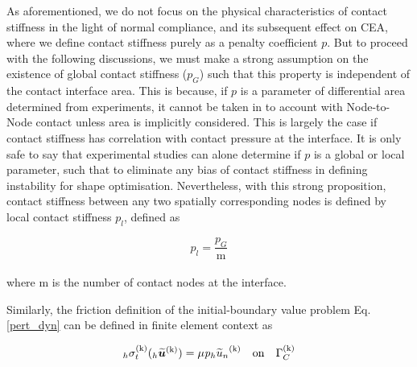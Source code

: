 As aforementioned, we do not focus on the physical characteristics of contact stiffness in the light of normal compliance, and its subsequent effect on CEA, where we define contact stiffness purely as a penalty coefficient $p$. 
But to proceed with the following discussions, we must make a strong assumption on the existence of global contact stiffness ($p_{G}$) such that this property is independent of the contact interface area. 
This is because, if $p$ is a parameter of differential area determined from experiments, it cannot be taken in to account with Node-to-Node contact unless area is implicitly considered. This is largely the case if contact stiffness has correlation with contact pressure at the interface. 
 It is only safe to say that experimental studies can alone determine if $p$ is a global or local parameter, such that to eliminate any bias of contact stiffness in defining instability for shape optimisation. 
Nevertheless, with this strong proposition, contact stiffness between any two spatially corresponding nodes is defined by local contact stiffness $p_{l}$, defined as 
   
\begin{equation}
p_{l} = \frac{p_G}{\mathrm{m}}
\end{equation}\\

where ${\mathrm{m}}$ is the number of contact nodes at the interface.

Similarly, the friction definition of the initial-boundary value problem Eq. \eqref{pert_dyn} can be defined in finite element context as 

\begin{equation}
{}_h\sigma^{(\mathrm k)}_t({}_h\bm{\widetilde u}^\mathrm{(k)}) = \mu \mathit{p}{{}_h\widetilde{u}_n}^{(\mathrm k)} \quad \mathrm{on}\quad\Gamma^{\mathrm{(k)}}_C\\
\end{equation}

